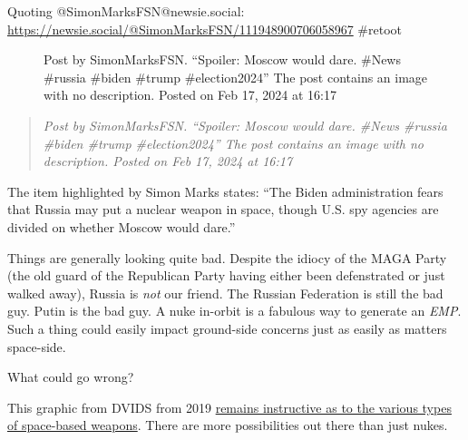 Quoting @SimonMarksFSN@newsie.social:
\url{https://newsie.social/@SimonMarksFSN/111948900706058967} \#retoot

\begin{figure}
\centering
{}
\caption{Post by SimonMarksFSN. ``Spoiler: Moscow would dare. \#News
\#russia \#biden \#trump \#election2024'' The post contains an image
with no description. Posted on Feb 17, 2024 at 16:17}
\end{figure}

\begin{quote}
\emph{Post by SimonMarksFSN. ``Spoiler: Moscow would dare. \#News
\#russia \#biden \#trump \#election2024'' The post contains an image
with no description. Posted on Feb 17, 2024 at 16:17}
\end{quote}

The item highlighted by Simon Marks states: ``The Biden administration
fears that Russia may put a nuclear weapon in space, though U.S. spy
agencies are divided on whether Moscow would dare.''

Things are generally looking quite bad. Despite the idiocy of the MAGA
Party (the old guard of the Republican Party having either been
defenstrated or just walked away), Russia is \emph{not} our friend. The
Russian Federation is still the bad guy. Putin is the bad guy. A nuke
in-orbit is a fabulous way to generate an \emph{EMP}. Such a thing could
easily impact ground-side concerns just as easily as matters space-side.

What could go wrong?

This graphic from DVIDS from 2019
\href{https://www.dvidshub.net/graphic/9655/competing-space-space-based-weapons}{remains
instructive as to the various types of space-based weapons}. There are
more possibilities out there than just nukes.
